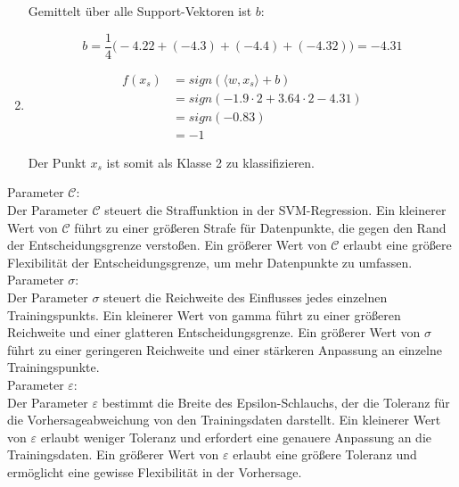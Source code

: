 \documentclass[a4paper,12pt]{article}
\begin{document}
\begin{enumerate}
	Gemittelt über alle Support-Vektoren ist $b$:

	\[b = \frac{1}{4} \biggl(-4.22 + (-4.3) + (-4.4) + (-4.32)\biggr) = -4.31 \]
	
	\item

	\begin{align*}
		f(x_s) &= sign(\langle w, x_s\rangle + b) \\
			&= sign(-1.9 \cdot 2 + 3.64 \cdot 2 - 4.31) \\
			&= sign(-0.83) \\
			&= -1 
	\end{align*}

	Der Punkt $x_s$ ist somit als Klasse 2 zu klassifizieren.
\end{enumerate}





Parameter $\mathcal{C}$:\\

Der Parameter $\mathcal{C}$ steuert die Straffunktion in der SVM-Regression. 
Ein kleinerer Wert von $\mathcal{C}$ führt zu einer größeren Strafe für Datenpunkte, 
die gegen den Rand der Entscheidungsgrenze verstoßen. Ein größerer Wert von $\mathcal{C}$ erlaubt eine 
größere Flexibilität der Entscheidungsgrenze, um mehr Datenpunkte zu umfassen. \\




Parameter $\sigma$:\\

Der Parameter $\sigma$ steuert die Reichweite des Einflusses jedes 
einzelnen Trainingspunkts. Ein kleinerer Wert von gamma führt zu einer größeren Reichweite 
und einer glatteren Entscheidungsgrenze. Ein größerer Wert von $\sigma$ führt zu einer 
geringeren Reichweite und einer stärkeren Anpassung an einzelne Trainingspunkte. \\



Parameter $\varepsilon$:\\

Der Parameter $\varepsilon$ bestimmt die Breite des Epsilon-Schlauchs, 
der die Toleranz für die Vorhersageabweichung von den Trainingsdaten darstellt. 
Ein kleinerer Wert von $\varepsilon$ erlaubt weniger Toleranz und erfordert eine 
genauere Anpassung an die Trainingsdaten. 
Ein größerer Wert von $\varepsilon$ erlaubt eine größere Toleranz und ermöglicht eine 
gewisse Flexibilität in der Vorhersage.
\end{document}
